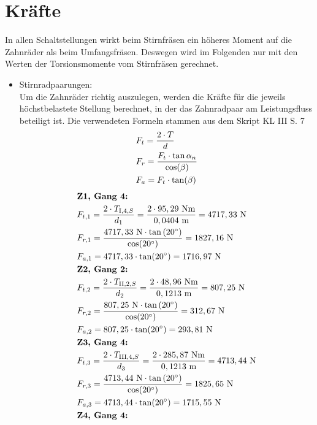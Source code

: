 \section{Kräfte}
In allen Schaltstellungen wirkt beim Stirnfräsen ein höheres Moment auf die Zahnräder als beim Umfangsfräsen. Deswegen wird im Folgenden nur mit den Werten der Torsionsmomente vom Stirnfräsen gerechnet. 
\begin{itemize}
\item Stirnradpaarungen: \\
Um die Zahnräder richtig auszulegen, werden die Kräfte für die jeweils höchstbelastete Stellung berechnet, in der das Zahnradpaar am Leistungsfluss beteiligt ist. 
Die verwendeten Formeln stammen aus dem Skript KL III S. 7
\begin{align*}
	&F_t = \frac{2\cdot T}{d} \\
	&F_r= \frac{F_t \cdot \tan{\alpha_n}}{\cos(\beta)} \\
	&F_a = F_t \cdot \tan(\beta) \\
\end{align*}
\begin{align*}
	&\textbf{Z1, Gang 4:} \\
	&F_{t,1} = \frac{2\x T_{\mathrm{I},4,S}}{d_1} = \frac{2 \x 95,29 \text{ Nm}}{0,0404 \text{ m}} = 4717,33 \text{ N}\\ 
	&F_{r,1} = \frac{4717,33 \text{ N} \x \tan{(20^\circ)}}{\cos(20^\circ)} = 1827,16\text{ N}\\ 
	&F_{a,1} = 4717,33 \x \tan(20^\circ) = 1716,97 \text{ N}\\
	&\textbf{Z2, Gang 2:} \\
	&F_{t,2} = \frac{2\x T_{\mathrm{II},2,S}}{d_2} = \frac{2 \x 48,96 \text{ Nm}}{0,1213 \text{ m}} = 807,25 \text{ N}\\ 
	&F_{r,2} = \frac{807,25 \text{ N} \x \tan{(20^\circ)}}{\cos(20^\circ)} = 312,67\text{ N}\\ 
	&F_{a,2} = 807,25 \x \tan(20^\circ) = 293,81 \text{ N}\\
	&\textbf{Z3, Gang 4:} \\
	&F_{t,3} = \frac{2\x T_{\mathrm{III},4,S}}{d_3} = \frac{2 \x 285,87 \text{ Nm}}{0,1213 \text{ m}} = 4713,44 \text{ N}\\ 
	&F_{r,3} = \frac{4713,44 \text{ N} \x \tan{(20^\circ)}}{\cos(20^\circ)} = 1825,65\text{ N}\\ 
	&F_{a,3} = 4713,44 \x \tan(20^\circ) = 1715,55 \text{ N}\\
	&\textbf{Z4, Gang 4:} \\

\end{align*}
\end{itemize}

